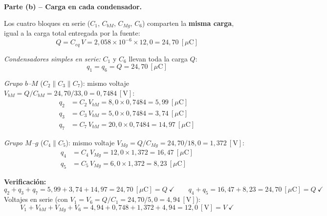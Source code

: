 \documentclass[12pt,letterpaper]{article}
\begin{document}
\medskip
\noindent\textbf{Parte (b) -- Carga en cada condensador.}

Los cuatro bloques en serie ($C_1$, $C_{bM}$, $C_{Mg}$, $C_6$) comparten la \textbf{misma carga},
igual a la carga total entregada por la fuente:
\[
    Q = C_{eq}\,V = 2{,}058\times10^{-6}\times 12{,}0 = 24{,}70\ [\mu\text{C}]
\]

\noindent\emph{Condensadores simples en serie:} $C_1$ y $C_6$ llevan toda la carga $Q$:
\[
    \boxed{q_1 = q_6 = Q = 24{,}70\ [\mu\text{C}]}
\]

\noindent\emph{Grupo $b$--$M$} ($C_2\parallel C_3\parallel C_7$): mismo voltaje
$V_{bM} = Q/C_{bM} = 24{,}70/33{,}0 = 0{,}7484\ [\text{V}]$:
\begin{align*}
    q_2 &= C_2\,V_{bM} = 8{,}0\times 0{,}7484 = 5{,}99\ [\mu\text{C}]\\
    q_3 &= C_3\,V_{bM} = 5{,}0\times 0{,}7484 = 3{,}74\ [\mu\text{C}]\\
    q_7 &= C_7\,V_{bM} = 20{,}0\times 0{,}7484 = 14{,}97\ [\mu\text{C}]
\end{align*}

\noindent\emph{Grupo $M$--$g$} ($C_4\parallel C_5$): mismo voltaje
$V_{Mg} = Q/C_{Mg} = 24{,}70/18{,}0 = 1{,}372\ [\text{V}]$:
\begin{align*}
    q_4 &= C_4\,V_{Mg} = 12{,}0\times 1{,}372 = 16{,}47\ [\mu\text{C}]\\
    q_5 &= C_5\,V_{Mg} = 6{,}0\times 1{,}372 = 8{,}23\ [\mu\text{C}]
\end{align*}

\medskip
\noindent\textbf{Verificaci\'on:}
\[
    q_2+q_3+q_7 = 5{,}99+3{,}74+14{,}97 = 24{,}70\ [\mu\text{C}] = Q\ \checkmark
    \qquad
    q_4+q_5 = 16{,}47+8{,}23 = 24{,}70\ [\mu\text{C}] = Q\ \checkmark
\]
Voltajes en serie (con $V_1 = V_6 = Q/C_1 = 24{,}70/5{,}0 = 4{,}94\ [\text{V}]$):
\[
    V_1 + V_{bM} + V_{Mg} + V_6 = 4{,}94 + 0{,}748 + 1{,}372 + 4{,}94 = 12{,}0\ [\text{V}] = V\ \checkmark
\]
\end{document}
